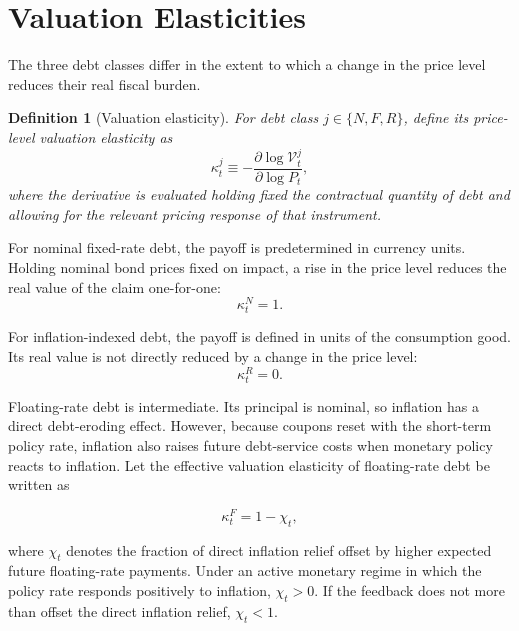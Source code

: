 \documentclass[12pt,a4paper]{article}
\newtheorem{definition}{Definition}
\begin{document}
\section{Valuation Elasticities}

The three debt classes differ in the extent to which a change in the price level reduces
their real fiscal burden.


\begin{definition}[Valuation elasticity]
For debt class $j \in \{N,F,R\}$, define its price-level valuation elasticity as
\begin{equation}
\kappa_t^j
\equiv
-
\frac{\partial \log \mathcal{V}_t^j}{\partial \log P_t},
\label{eq:kappa_def}
\end{equation}
where the derivative is evaluated holding fixed the contractual quantity of debt and
allowing for the relevant pricing response of that instrument.
\end{definition}


For nominal fixed-rate debt, the payoff is predetermined in currency units. Holding
nominal bond prices fixed on impact, a rise in the price level reduces the real value of
the claim one-for-one:
\begin{equation}
\kappa_t^N = 1.
\label{eq:kappa_nominal}
\end{equation}

For inflation-indexed debt, the payoff is defined in units of the consumption good. Its
real value is not directly reduced by a change in the price level:
\begin{equation}
\kappa_t^R = 0.
\label{eq:kappa_real}
\end{equation}

Floating-rate debt is intermediate. Its principal is nominal, so inflation has a direct
debt-eroding effect. However, because coupons reset with the short-term policy rate,
inflation also raises future debt-service costs when monetary policy reacts to inflation.
Let the effective valuation elasticity of floating-rate debt be written as

\begin{equation}
\kappa_t^F
=
1-\chi_t,
\label{eq:kappa_float}
\end{equation}

where $\chi_t$ denotes the fraction of direct inflation relief offset by higher expected
future floating-rate payments. Under an active monetary regime in which the policy rate
responds positively to inflation, $\chi_t>0$. If the feedback does not more than offset
the direct inflation relief, $\chi_t<1$.
\end{document}
